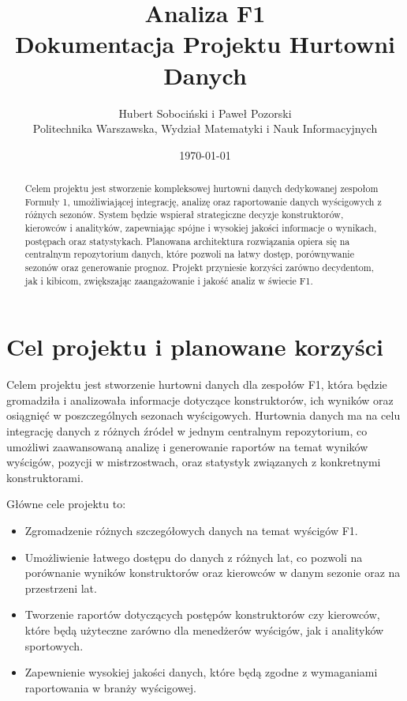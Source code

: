 \documentclass[12pt]{article}
\title{{\Huge Analiza F1} \\ \small Dokumentacja Projektu Hurtowni Danych}
\author{Hubert Sobociński i Paweł Pozorski \\ \small Politechnika Warszawska, Wydział Matematyki i Nauk Informacyjnych}
\date{\today}
\begin{document}
\maketitle

\begin{abstract}
    Celem projektu jest stworzenie kompleksowej hurtowni danych dedykowanej zespołom Formuły 1, umożliwiającej integrację, analizę oraz raportowanie danych wyścigowych z różnych sezonów. System będzie wspierał strategiczne decyzje konstruktorów, kierowców i analityków, zapewniając spójne i wysokiej jakości informacje o wynikach, postępach oraz statystykach. Planowana architektura rozwiązania opiera się na centralnym repozytorium danych, które pozwoli na łatwy dostęp, porównywanie sezonów oraz generowanie prognoz. Projekt przyniesie korzyści zarówno decydentom, jak i kibicom, zwiększając zaangażowanie i jakość analiz w świecie F1.
\end{abstract}

\newpage
\tableofcontents
\newpage

\section{Cel projektu i planowane korzyści}
Celem projektu jest stworzenie hurtowni danych dla zespołów F1, która będzie gromadziła i analizowała informacje dotyczące konstruktorów, ich wyników oraz osiągnięć w poszczególnych sezonach wyścigowych. Hurtownia danych ma na celu integrację danych z różnych źródeł w jednym centralnym repozytorium, co umożliwi zaawansowaną analizę i generowanie raportów na temat wyników wyścigów, pozycji w mistrzostwach, oraz statystyk związanych z konkretnymi konstruktorami.

Główne cele projektu to:

\begin{itemize}
    \item Zgromadzenie różnych szczegółowych danych na temat wyścigów F1.
    \item Umożliwienie łatwego dostępu do danych z różnych lat, co pozwoli na porównanie wyników konstruktorów oraz kierowców w danym sezonie oraz na przestrzeni lat.
    \item Tworzenie raportów dotyczących postępów konstruktorów czy kierowców, które będą użyteczne zarówno dla menedżerów wyścigów, jak i analityków sportowych.
    \item Zapewnienie wysokiej jakości danych, które będą zgodne z wymaganiami raportowania w branży wyścigowej.
\end{itemize}
\end{document}
